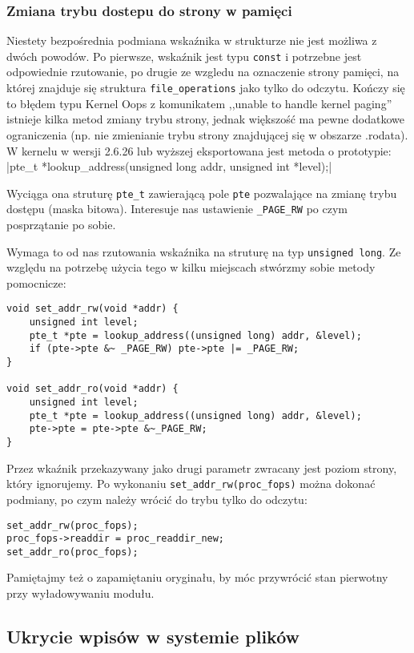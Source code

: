 \documentclass[a4paper]{article}
\begin{document}
\subsubsection{Zmiana trybu dostepu do strony w pamięci}
Niestety bezpośrednia podmiana wskaźnika w strukturze nie jest możliwa z dwóch
powodów. Po pierwsze, wskaźnik jest typu \texttt{const} i potrzebne jest
odpowiednie rzutowanie, po drugie ze wzgledu na oznaczenie strony pamięci, na
której znajduje się struktura \texttt{file\_operations} jako tylko do odczytu.
Kończy się to błędem typu Kernel Oops z komunikatem ,,unable to handle kernel
paging'' istnieje kilka metod zmiany trybu strony, jednak większość ma pewne
dodatkowe ograniczenia (np. nie zmienianie trybu strony znajdującej się w
obszarze .rodata). W kernelu w wersji 2.6.26 lub wyższej eksportowana jest
metoda o prototypie\cite{stovf1}:
|pte_t *lookup_address(unsigned long addr, unsigned int *level);|

Wyciąga ona struturę \texttt{pte\_t} zawierającą pole \texttt{pte} pozwalające
na zmianę trybu dostępu (maska bitowa). Interesuje nas ustawienie
\texttt{\_PAGE\_RW} po czym posprzątanie po sobie.

Wymaga to od nas rzutowania wskaźnika na struturę na typ \texttt{unsigned
long}. Ze względu na potrzebę użycia tego w kilku miejscach stwórzmy sobie
metody pomocnicze:
\begin{verbatim}
void set_addr_rw(void *addr) {
	unsigned int level;
	pte_t *pte = lookup_address((unsigned long) addr, &level);
	if (pte->pte &~ _PAGE_RW) pte->pte |= _PAGE_RW;
}

void set_addr_ro(void *addr) {
	unsigned int level;
	pte_t *pte = lookup_address((unsigned long) addr, &level);
	pte->pte = pte->pte &~_PAGE_RW;
}
\end{verbatim}
Przez wkaźnik przekazywany jako drugi parametr zwracany jest poziom strony,
który ignorujemy. Po wykonaniu \texttt{set\_addr\_rw(proc\_fops)} można
dokonać podmiany, po czym należy wrócić do trybu tylko do odczytu:
\begin{verbatim}
set_addr_rw(proc_fops);
proc_fops->readdir = proc_readdir_new;
set_addr_ro(proc_fops);
\end{verbatim}
Pamiętajmy też o zapamiętaniu oryginału, by móc przywrócić stan pierwotny przy
wyładowywaniu modułu.

\subsection{Ukrycie wpisów w systemie plików}
\end{document}
